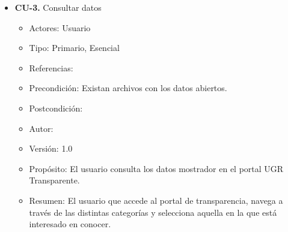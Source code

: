 \begin{itemize}
 
  \item \textbf{CU-3.} Consultar datos
  \begin{itemize}
    \item Actores: Usuario
    \item Tipo: Primario, Esencial
    \item Referencias:
    \item Precondición: Existan archivos con los datos abiertos.
    \item Postcondición:
    \item Autor: \autor
    \item Versión: 1.0
    \item Propósito: El usuario consulta los datos mostrador en el portal UGR Transparente.
    \item Resumen: El usuario que accede al portal de transparencia, navega a través de las distintas categorías y selecciona
    aquella en la que está interesado en conocer.
  \end{itemize}
 

\end{itemize}
